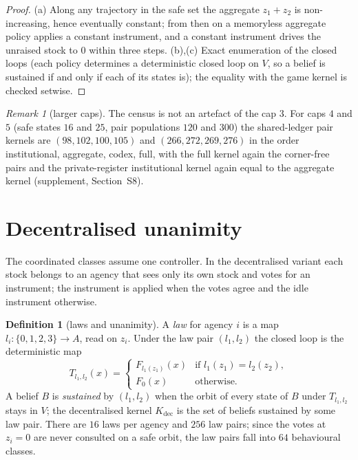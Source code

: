 \documentclass[11pt,a4paper]{article}
\theoremstyle{plain}
\theoremstyle{definition}
\newtheorem{definition}[theorem]{Definition}
\theoremstyle{remark}
\newtheorem{remark}[theorem]{Remark}
\newcommand{\Kdec}{K_{\mathrm{dec}}}
\begin{document}
\begin{proof}
(a) Along any trajectory in the safe set the aggregate $z_1+z_2$ is non-increasing, hence eventually constant; from then on a memoryless aggregate policy applies a constant instrument, and a constant instrument drives the unraised stock to $0$ within three steps. (b),(c) Exact enumeration of the closed loops (each policy determines a deterministic closed loop on $V$, so a belief is sustained if and only if each of its states is); the equality with the game kernel is checked setwise.
\end{proof}

\begin{remark}[larger caps]
The census is not an artefact of the cap $3$. For caps $4$ and $5$ (safe states $16$ and $25$, pair populations $120$ and $300$) the shared-ledger pair kernels are $(98,102,100,105)$ and $(266,272,269,276)$ in the order institutional, aggregate, codex, full, with the full kernel again the corner-free pairs and the private-register institutional kernel again equal to the aggregate kernel (supplement, Section~S8).
\end{remark}
\section{Decentralised unanimity}\label{sec:dec}

The coordinated classes assume one controller. In the decentralised variant each stock belongs to an agency that sees only its own stock and votes for an instrument; the instrument is applied when the votes agree and the idle instrument otherwise.

\begin{definition}[laws and unanimity]\label{def:laws}
A \emph{law} for agency $i$ is a map $l_i:\{0,1,2,3\}\to A$, read on $z_i$. Under the law pair $(l_1,l_2)$ the closed loop is the deterministic map
\[
T_{l_1,l_2}(x)=\begin{cases}F_{l_1(z_1)}(x) & \text{if } l_1(z_1)=l_2(z_2),\\ F_0(x) & \text{otherwise.}\end{cases}
\]
A belief $B$ is \emph{sustained} by $(l_1,l_2)$ when the orbit of every state of $B$ under $T_{l_1,l_2}$ stays in $V$; the decentralised kernel $\Kdec$ is the set of beliefs sustained by some law pair. There are $16$ laws per agency and $256$ law pairs; since the votes at $z_i=0$ are never consulted on a safe orbit, the law pairs fall into $64$ behavioural classes.
\end{definition}
\end{document}
